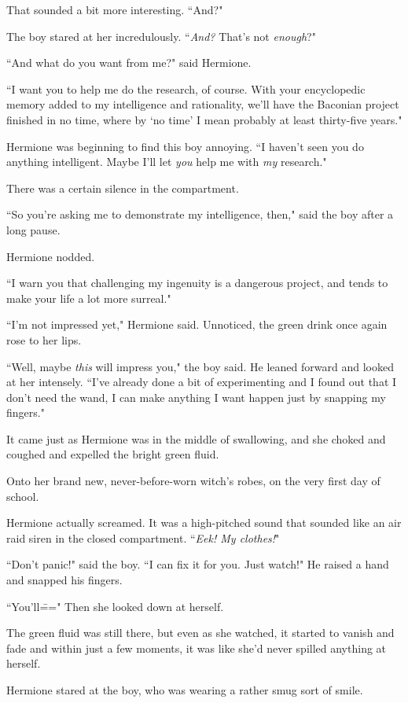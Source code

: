 That sounded a bit more interesting. ``And?"

The boy stared at her incredulously. ``\emph{And?} That's not \emph{enough}?"

``And what do you want from me?" said Hermione.

``I want you to help me do the research, of course. With your encyclopedic memory added to my intelligence and rationality, we'll have the Baconian project finished in no time, where by `no time' I mean probably at least thirty-five years."

Hermione was beginning to find this boy annoying. ``I haven't seen you do anything intelligent. Maybe I'll let \emph{you} help me with \emph{my} research."

There was a certain silence in the compartment.

``So you're asking me to demonstrate my intelligence, then," said the boy after a long pause.

Hermione nodded.

``I warn you that challenging my ingenuity is a dangerous project, and tends to make your life a lot more surreal."

``I'm not impressed yet," Hermione said. Unnoticed, the green drink once again rose to her lips.

``Well, maybe \emph{this} will impress you," the boy said. He leaned forward and looked at her intensely. ``I've already done a bit of experimenting and I found out that I don't need the wand, I can make anything I want happen just by snapping my fingers."

It came just as Hermione was in the middle of swallowing, and she choked and coughed and expelled the bright green fluid.

Onto her brand new, never-before-worn witch's robes, on the very first day of school.

Hermione actually screamed. It was a high-pitched sound that sounded like an air raid siren in the closed compartment. ``\emph{Eek! My clothes!}"

``Don't panic!" said the boy. ``I can fix it for you. Just watch!" He raised a hand and snapped his fingers.

``You'll\===" Then she looked down at herself.

The green fluid was still there, but even as she watched, it started to vanish and fade and within just a few moments, it was like she'd never spilled anything at herself.

Hermione stared at the boy, who was wearing a rather smug sort of smile.

